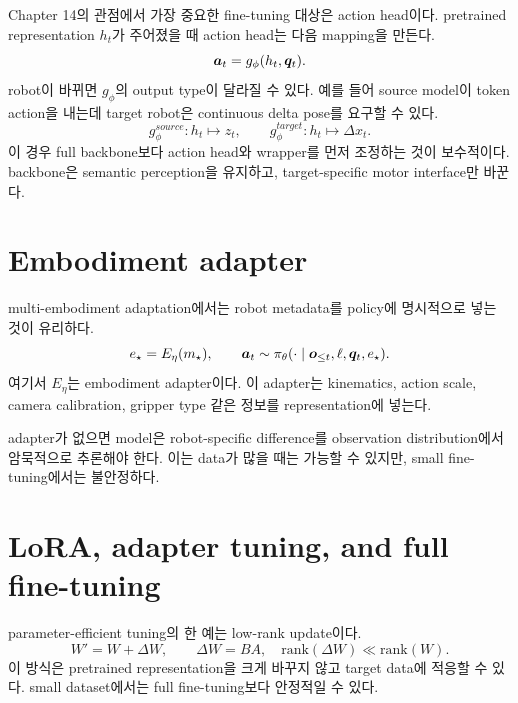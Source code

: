 Chapter 14의 관점에서 가장 중요한 fine-tuning 대상은 action head이다. pretrained representation $h_t$가 주어졌을 때 action head는 다음 mapping을 만든다.
\begin{equation}
  \bm{a}_t
  =
  g_{\phi}(h_t,\bm{q}_t).
  \label{eq:ch15-action-head}
\end{equation}
robot이 바뀌면 $g_{\phi}$의 output type이 달라질 수 있다. 예를 들어 source model이 token action을 내는데 target robot은 continuous delta pose를 요구할 수 있다.
\begin{equation}
  g_{\phi}^{source}: h_t \mapsto z_t,
  \qquad
  g_{\phi}^{target}: h_t \mapsto \Delta x_t.
  \label{eq:ch15-head-replacement}
\end{equation}
이 경우 full backbone보다 action head와 wrapper를 먼저 조정하는 것이 보수적이다. backbone은 semantic perception을 유지하고, target-specific motor interface만 바꾼다.

\section{Embodiment adapter}

multi-embodiment adaptation에서는 robot metadata를 policy에 명시적으로 넣는 것이 유리하다.
\begin{equation}
  e_{\star}
  =
  E_{\eta}(m_{\star}),
  \qquad
  \bm{a}_t
  \sim
  \pi_{\theta}
  (\cdot\mid \bm{o}_{\leq t},\ell,\bm{q}_t,e_{\star}).
  \label{eq:ch15-embodiment-adapter}
\end{equation}
여기서 $E_{\eta}$는 embodiment adapter이다. 이 adapter는 kinematics, action scale, camera calibration, gripper type 같은 정보를 representation에 넣는다.

adapter가 없으면 model은 robot-specific difference를 observation distribution에서 암묵적으로 추론해야 한다. 이는 data가 많을 때는 가능할 수 있지만, small fine-tuning에서는 불안정하다.

\section{LoRA, adapter tuning, and full fine-tuning}

parameter-efficient tuning의 한 예는 low-rank update이다.
\begin{equation}
  W'
  =
  W
  +
  \Delta W,
  \qquad
  \Delta W
  =
  BA,
  \quad
  \mathrm{rank}(\Delta W)\ll \mathrm{rank}(W).
  \label{eq:ch15-lora}
\end{equation}
이 방식은 pretrained representation을 크게 바꾸지 않고 target data에 적응할 수 있다. small dataset에서는 full fine-tuning보다 안정적일 수 있다.

